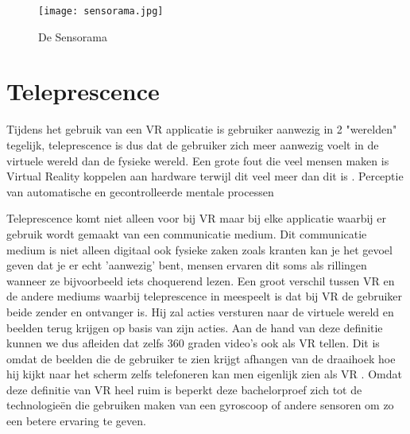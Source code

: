 \begin{figure}
    \texttt{[image: sensorama.jpg]}
    \caption{De Sensorama}
    \label{fig:sensorama}
\end{figure}

\section{Teleprescence}
Tijdens het gebruik van een VR applicatie is gebruiker aanwezig in 2 "werelden" tegelijk, teleprescence is dus dat de gebruiker zich meer aanwezig voelt in de virtuele wereld dan de fysieke wereld.
Een grote fout die veel mensen maken is Virtual Reality koppelen aan hardware terwijl dit veel meer dan dit is \autocite{Steuer1992}.
Perceptie van automatische en gecontrolleerde mentale processen

Teleprescence komt niet alleen voor bij VR maar bij elke applicatie waarbij er gebruik wordt gemaakt van een communicatie medium. Dit communicatie medium is niet alleen digitaal ook fysieke zaken zoals kranten kan je het gevoel geven dat je er echt 'aanwezig' bent, mensen ervaren dit soms als rillingen wanneer ze bijvoorbeeld iets choquerend lezen. 
Een groot verschil tussen VR en de andere mediums waarbij teleprescence in meespeelt is dat bij VR de gebruiker beide zender en ontvanger is. Hij zal acties versturen naar de virtuele wereld en beelden terug krijgen op basis van zijn acties.
Aan de hand van deze definitie kunnen we dus afleiden dat zelfs 360 graden video's ook als VR tellen. Dit is omdat de beelden die de gebruiker te zien krijgt afhangen van de draaihoek hoe hij kijkt naar het scherm zelfs telefoneren kan men eigenlijk zien als VR \autocite{Steuer1992}.
Omdat deze definitie van VR heel ruim is beperkt deze bachelorproef zich tot de technologieën die gebruiken maken van een gyroscoop of andere sensoren om zo een betere ervaring te geven.


